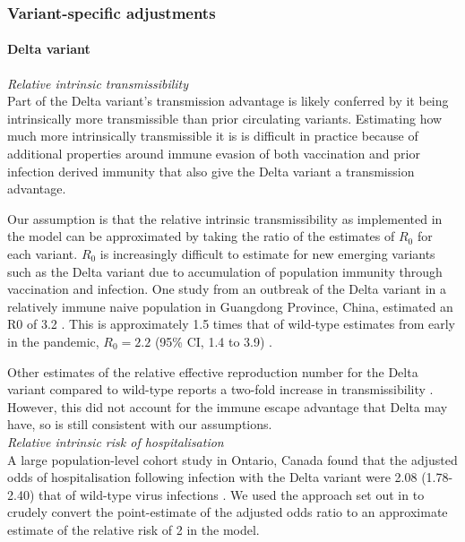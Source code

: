 \subsubsection{Variant-specific adjustments}
\label{strain_params}
\paragraph{Delta variant}

\textit{Relative intrinsic transmissibility}\\
Part of the Delta variant's transmission advantage is likely conferred by it being intrinsically more transmissible than prior circulating 
variants. Estimating how much more intrinsically transmissible it is is difficult in practice because of additional properties around immune 
evasion of both vaccination and prior infection derived immunity that also give the Delta variant a transmission advantage.

Our assumption is that the relative intrinsic transmissibility as implemented in the model can be approximated by taking the ratio of the estimates 
of $R_0$ for each variant. $R_0$ is increasingly difficult to estimate for new emerging variants such as the Delta variant due to accumulation of 
population immunity through vaccination and infection. One study from an outbreak of the Delta variant in a relatively immune naive population 
in Guangdong Province, China, estimated an R0 of 3.2 \cite{meng2021}. This is approximately 1.5 times that of wild-type estimates from early in the 
pandemic, $R_0=2.2$ (95\% CI, 1.4 to 3.9) \cite{li2020}. 

Other estimates of the relative effective reproduction number for the Delta variant compared to wild-type reports a two-fold increase in transmissibility \cite{campbell2021}. 
However, this did not account for the immune escape advantage that Delta may have, so is still consistent with our assumptions.\\

\textit{Relative intrinsic risk of hospitalisation}\\
A large population-level cohort study in Ontario, Canada found that the adjusted odds of hospitalisation following infection with the Delta variant were 2.08 (1.78-2.40) that of 
wild-type virus infections \cite{fisman2021}. We used the approach set out in \cite{zhang1998} to crudely convert the point-estimate of the adjusted odds ratio to an approximate estimate 
of the relative risk of 2 in the model.\\


